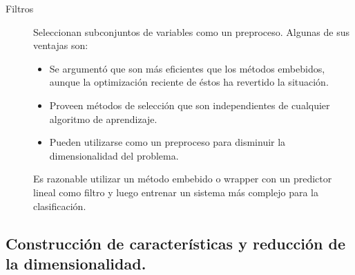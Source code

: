 \documentclass[11pt,spanish]{article}
\begin{document}
\begin{description}
    \item[Filtros] Seleccionan subconjuntos de variables como un 
    preproceso. Algunas de sus ventajas son:
    \begin{itemize}
        \item Se argumentó que son más eficientes que los
        métodos embebidos, aunque la optimización reciente de éstos ha revertido la situación. 
        \item Proveen métodos de selección que son independientes de cualquier algoritmo de aprendizaje.
        \item Pueden utilizarse como un preproceso para disminuir la dimensionalidad del problema.
    \end{itemize}
    Es razonable utilizar un método embebido o wrapper con un predictor lineal como filtro y luego entrenar un sistema más complejo para la clasificación.

\end{description}

\subsection{Construcción de características y reducción de la dimensionalidad.}
\end{document}
